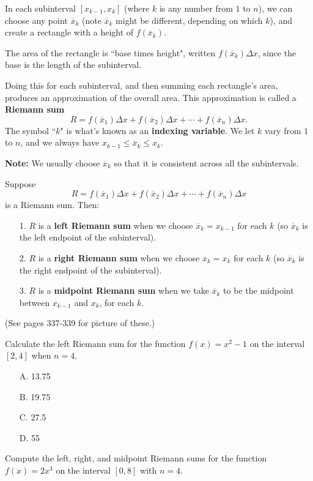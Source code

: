 \documentclass[cal1spr16Lectures.tex]{subfiles}
\begin{document}
\begin{frame}\footnotesize
In each subinterval $[x_{k-1}, x_k]$ (where $k$ is any number from $1$ to $n$), we can choose any point $\overline{x}_k$ (note $\overline{x}_k$ might be different, depending on which $k$), and create a rectangle with a height of $f(\overline{x}_k)$.

\vspace{1pc}
The area of the rectangle is ``base times height", written $f(\overline{x}_k)\Delta x$, since the base is the length of the subinterval.

\vspace{1pc}
Doing this for each subinterval, and then summing each rectangle's area, produces an approximation of the overall area.  This approximation is called a {\bf Riemann sum}
\[R=f(\overline{x}_1)\Delta x + f(\overline{x}_2)\Delta x + \cdots + f(\overline{x}_n)\Delta x.\]
The symbol ``$k$" is what's known as an {\bf indexing variable}.  We let $k$ vary from $1$ to $n$, and we always have $x_{k-1}\leq \overline x_k\leq x_k$.  
\end{frame}

\begin{frame}{}{}\footnotesize
{\bf Note:} We usually choose $\overline{x}_k$ so that it is consistent across all the subintervals.  
\begin{dfn}
Suppose
\[
R=f(\overline{x}_1)\Delta x + f(\overline{x}_2)\Delta x + \cdots + f(\overline{x}_n)\Delta x
\]
is a Riemann sum.  Then:
\begin{itemize}
\item[1.] $R$ is a {\bf left Riemann sum} when we choose $\overline x_k=x_{k-1}$ for each $k$ (so $\overline x_k$ is the left endpoint of the subinterval).  
\item[2.] $R$ is a {\bf right Riemann sum} when we choose $\overline x_k=x_k$ for each $k$ (so $\overline x_k$ is the right endpoint of the subinterval).
\item[3.] $R$ is a {\bf midpoint Riemann sum} when we take $\overline x_k$ to be the midpoint between $x_{k-1}$ and $x_k$, for each $k$.  
\end{itemize}
\end{dfn}
(See pages 337-339 for picture of these.)
\end{frame}

\begin{frame}\footnotesize
\begin{ex}
Calculate the left Riemann sum for the function $f(x)=x^2-1$ on the interval $[2,4]$ when $n=4$.
\begin{itemize}
\item[A.] 13.75
\item[B.] 19.75
\item[C.] 27.5
\item[D.] 55
\end{itemize}
\end{ex}
\begin{exe}
Compute the left, right, and midpoint Riemann sums for the function $f(x)=2x^3$ on the interval $[0,8]$ with $n=4$.
\end{exe}
\end{frame}
\end{document}
